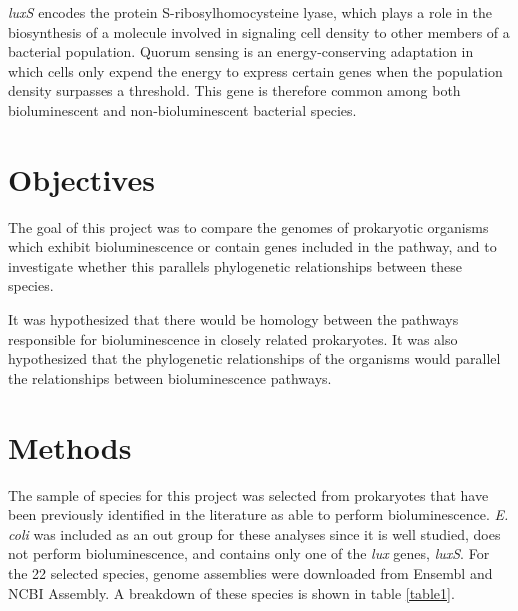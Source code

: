 \documentclass[fleqn,12pt]{wlscirep}
\begin{document}
\textit{luxS} encodes the protein S-ribosylhomocysteine lyase, which plays a role in the biosynthesis of a molecule involved in signaling cell density to other members of a bacterial population\cite{12}. Quorum sensing is an energy-conserving adaptation in which cells only expend the energy to express certain genes when the population density surpasses a threshold\cite{13}. This gene is therefore common among both bioluminescent and non-bioluminescent bacterial species.

\section*{Objectives}

The goal of this project was to compare the genomes of prokaryotic organisms which exhibit bioluminescence or contain genes included in the pathway, and to investigate whether this parallels phylogenetic relationships between these species.

It was hypothesized that there would be homology between the pathways responsible for bioluminescence in closely related prokaryotes. It was also hypothesized that the phylogenetic relationships of the organisms would parallel the relationships between bioluminescence pathways. 

\section*{Methods}

The sample of species for this project was selected from prokaryotes that have been previously identified in the literature as able to perform bioluminescence. \textit{E. coli} was included as an out group for these analyses since it is well studied, does not perform bioluminescence, and contains only one of the \textit{lux} genes, \textit{luxS}. For the 22 selected species, genome assemblies were downloaded from Ensembl and NCBI Assembly. A breakdown of these species is shown in table \ref{table1}.
\end{document}
